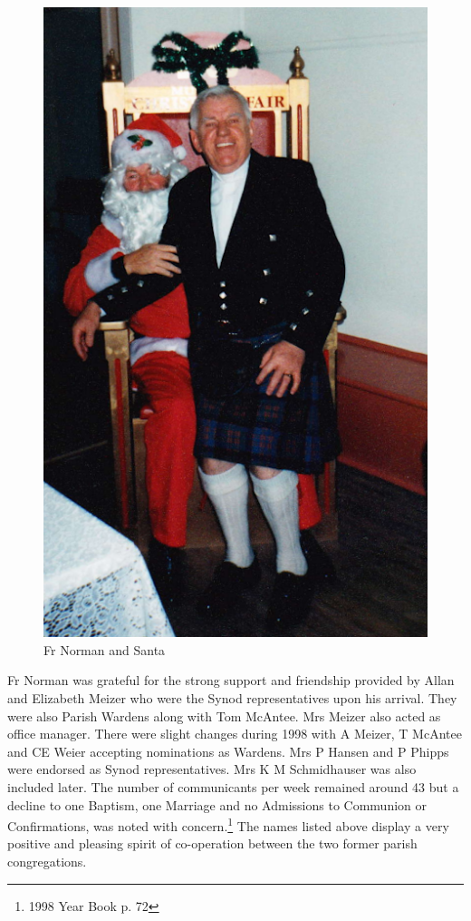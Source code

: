 \begin{figure}
\begin{center}
\includegraphics[width=.7\linewidth,center]{../images/frNormanSanta.png}
\caption{Fr Norman and Santa}
\end{center}
\end{figure}




Fr Norman was grateful for the strong support and friendship provided by Allan and Elizabeth Meizer who were the Synod representatives upon his arrival. They were also Parish Wardens along with Tom McAntee. Mrs Meizer also acted as office manager. There were slight changes during 1998 with A Meizer, T McAntee and CE Weier accepting nominations as Wardens. Mrs P Hansen and P Phipps were endorsed as Synod representatives. Mrs K M Schmidhauser was also included later. The number of communicants per week remained around 43 but a decline to one Baptism, one Marriage and no Admissions to Communion or Confirmations, was noted with concern.\footnote{1998 Year Book p. 72} The names listed above display a very positive and pleasing spirit of co-operation between the two former parish congregations.


